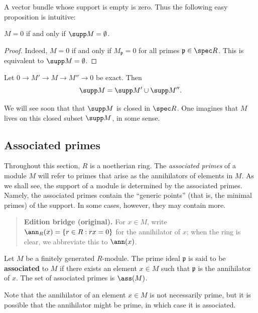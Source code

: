 A vector bundle whose support is empty is zero. Thus the following easy
proposition is intuitive:

\begin{proposition} 
$M = 0$ if and only if $\supp M = \emptyset$. 
\end{proposition}
\begin{proof} 
Indeed, $M=0$ if and only if $M_{\mathfrak{p}} = 0$ for all primes
$\mathfrak{p} \in \spec R$. This is equivalent to $\supp M = \emptyset$.
\end{proof} 
 
\begin{exercise} 
Let $0 \to M' \to M \to M'' \to 0$ be exact. Then 
\[ \supp M = \supp M' \cup \supp M''.  \]
\end{exercise} 


We will see soon that that $\supp M$ is closed in $\spec R$. One imagines that
$M$ lives on this closed subset $\supp M$, in some sense.



\subsection{Associated primes}
Throughout this section, $R$ is a noetherian ring. The \emph{associated
primes} of a module $M$ will refer to primes that arise as the annihilators of
elements in $M$. As we shall see, the support of  a module is determined by
the associated primes. Namely, the associated primes contain the ``generic
points'' (that is, the minimal primes) of the support. In some cases, however,
they may contain more. 

\begin{quote}\small\textbf{Edition bridge (original).}
For $x\in M$, write
$\ann_R(x)=\{r\in R:rx=0\}$ for the annihilator of $x$; when the ring is
clear, we abbreviate this to $\ann(x)$.\end{quote}

\begin{definition} 
Let $M$ be a finitely generated $R$-module.  The prime ideal $\mathfrak{p}$ is said to be
\textbf{associated} to $M$ if there exists an element $x \in M$ such that
$\mathfrak{p}$ is the annihilator of $x$.  The set of associated primes is
$\ass(M)$.
\end{definition} 

Note that the annihilator of an element $x \in M$ is not necessarily prime, but
it is possible that the annihilator might be prime, in which case it is
associated.

